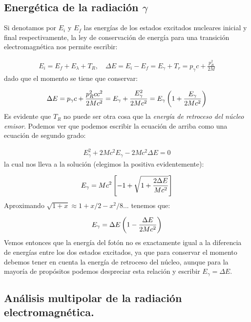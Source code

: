 \subsection{Energética de la radiación $\gamma$}

Si denotamos por $E_i$ y $E_f$ las energías de los estados excitados nucleares inicial y final respectivamente, la ley de conservación de energía para una transición electromagnética nos permite escribir:

\begin{eqnarray*}
	E_i = E_f + E_\lambda + T_R, \quad \Delta E = E_i - E_f = E_\gamma + T_r = p_\gamma c+ \frac{p^2_R}{2M}  
\end{eqnarray*}
dado que el momento se tiene que conservar:

\begin{eqnarray*}
	\Delta E = p_\gamma c+ \frac{p^2_Rc c^2}{2Mc^2} =E_\gamma + \frac{E_\gamma^2}{2Mc^2} = E_\gamma \left( 1+\frac{E_\gamma}{2Mc^2} \right)
\end{eqnarray*}
Es evidente que $T_R$ no puede ser otra cosa que la \textit{energía de retroceso del núcleo emisor}. Podemos ver que podemos escribir la ecuación de arriba como una ecuación de segundo grado:

\begin{eqnarray*}
	E_\gamma^2 +2 Mc^2 E_\gamma - 2Mc^2 \Delta E = 0 
\end{eqnarray*}
la cual nos  lleva a la solución (elegimos la positiva evidentemente):

\begin{eqnarray}
	E_\gamma = Mc^2 \left[ -1+\sqrt{1+\frac{2\Delta E}{Mc^2}} \right]
\end{eqnarray}
Aproximando $\sqrt{1+x} \approx 1+x/2-x^2/8...$ tenemos que:

\begin{eqnarray}
	E_\gamma = \Delta E \left( 1-\frac{\Delta E}{2Mc^2} \right)
\end{eqnarray}
Vemos entonces que la energía del fotón no es exactamente igual a la diferencia de energías entre los dos estados excitados, ya que para conservar el momento debemos tener en cuenta la energía de retroceso del núcleo, aunque para la mayoría de propósitos podemos despreciar esta relación y escribir $E_\gamma = \Delta  E$.

\subsection{Análisis multipolar de la radiación electromagnética.}

